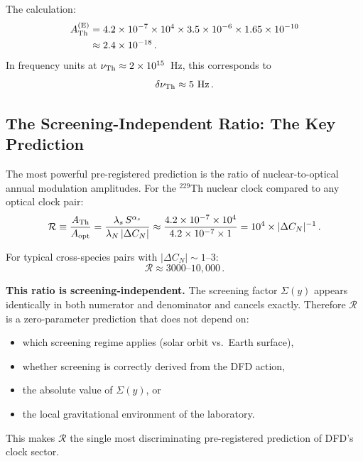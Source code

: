 \documentclass[twocolumn,showpacs,preprintnumbers,amsmath,amssymb,prd]{revtex4-2}
\begin{document}
The calculation:
\begin{align}
A_{\rm Th}^{(\rm E)} &= 4.2 \times 10^{-7} \times 10^4
  \times 3.5 \times 10^{-6} \times 1.65 \times 10^{-10}
  \nonumber\\
  &\approx 2.4 \times 10^{-18}\,.
\end{align}
In frequency units at $\nu_{\rm Th} \approx 2 \times 10^{15}$~Hz,
this corresponds to
\begin{equation}
\delta\nu_{\rm Th} \approx 5~\text{Hz}\,.
\end{equation}

\subsection{The Screening-Independent Ratio: The Key Prediction}
\label{sec:ratio}

The most powerful pre-registered prediction is the ratio of
nuclear-to-optical annual modulation amplitudes.  For the $^{229}$Th
nuclear clock compared to any optical clock pair:
\begin{equation}\label{eq:ratio}
\mathcal{R} \equiv \frac{A_{\rm Th}}{A_{\rm opt}}
= \frac{\lambda_s \, S^{\alpha_s}}{\lambda_N \, |\Delta C_N|}
\approx \frac{4.2 \times 10^{-7} \times 10^4}
       {4.2 \times 10^{-7} \times 1}
= 10^4 \times |\Delta C_N|^{-1}\,.
\end{equation}

For typical cross-species pairs with $|\Delta C_N| \sim 1$--$3$:
\begin{equation}\label{eq:ratio-value}
\boxed{\mathcal{R} \approx 3000\text{--}10{,}000}\,.
\end{equation}

\textbf{This ratio is screening-independent.}  The screening factor
$\Sigma(y)$ appears identically in both numerator and denominator
and cancels exactly.  Therefore $\mathcal{R}$ is a zero-parameter
prediction that does not depend on:
\begin{itemize}
\item which screening regime applies (solar orbit vs.\ Earth surface),
\item whether screening is correctly derived from the DFD action,
\item the absolute value of $\Sigma(y)$, or
\item the local gravitational environment of the laboratory.
\end{itemize}

This makes $\mathcal{R}$ the single most discriminating
pre-registered prediction of DFD's clock sector.
\end{document}
